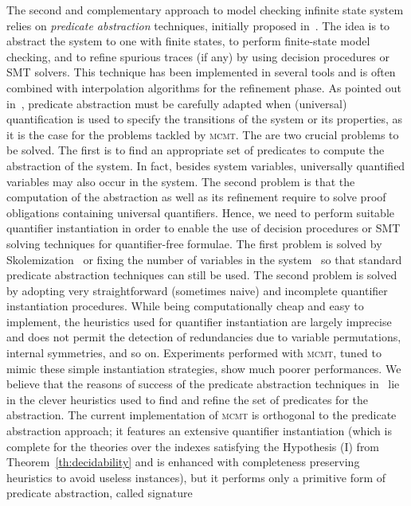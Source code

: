 \documentclass{LMCS}
\theoremstyle{plain}\newtheorem{assumption}[thm]{Assumption}
\theoremstyle{plain}\newtheorem{proposition}[thm]{Proposition}
\theoremstyle{plain}\newtheorem{property}[thm]{Property}
\theoremstyle{plain}\newtheorem{example}[thm]{Example}
\theoremstyle{plain}\newtheorem{claim}[thm]{Claim}
\theoremstyle{plain}\newtheorem{lemma}[thm]{Lemma}
\begin{document}
The second and complementary approach to model checking infinite state
system relies on \emph{predicate abstraction} techniques,
initially proposed in~\cite{seminal}.  The idea is to abstract the
system to one with finite states, to perform finite-state model
checking, and to refine spurious traces (if any) by using decision
procedures or SMT solvers.  This technique has been implemented in
several tools and is often combined with interpolation algorithms for the refinement
phase.  As pointed out in~\cite{qaaderflanagan,indexedabs}, predicate
abstraction must be carefully adapted when (universal) quantification
is used to specify the transitions of the system or its properties, as
it is the case for the problems tackled by \textsc{mcmt}.  The are two
crucial problems to be solved.  The first is to find an appropriate
set of predicates to compute the abstraction of the system.  In fact,
besides system variables, universally quantified variables may also
occur in the system.  The second problem is that the computation of
the abstraction as well as its refinement require to solve proof
obligations containing universal quantifiers.  Hence, we need to
perform suitable quantifier instantiation in order to enable the use
of decision procedures or SMT solving techniques for quantifier-free
formulae.  The first problem is solved by
Skolemization~\cite{qaaderflanagan} or fixing the number of variables
in the system~\cite{indexedabs} so that standard predicate abstraction
techniques can still be used.  The second problem is solved by
adopting very straightforward (sometimes naive) and incomplete
quantifier instantiation procedures.  While being computationally
cheap and easy to implement, the heuristics used for quantifier
instantiation are largely imprecise and does not permit the detection
of redundancies due to variable permutations, internal symmetries, and
so on.  Experiments performed with \textsc{mcmt}, tuned to mimic these
simple instantiation strategies, show much poorer performances.
We believe that the reasons of success of the predicate abstraction
techniques
in~\cite{qaaderflanagan,indexedabs} lie in the clever heuristics used to find and refine the set of
predicates for the abstraction.  The current implementation of
\textsc{mcmt} is orthogonal to the predicate abstraction approach; it
features an extensive quantifier instantiation (which is complete for
the theories over the indexes satisfying the Hypothesis (I) from
Theorem~\ref{th:decidability} and is enhanced with completeness
preserving heuristics to avoid useless instances), but it performs
only a primitive form of predicate abstraction, called signature
\end{document}
